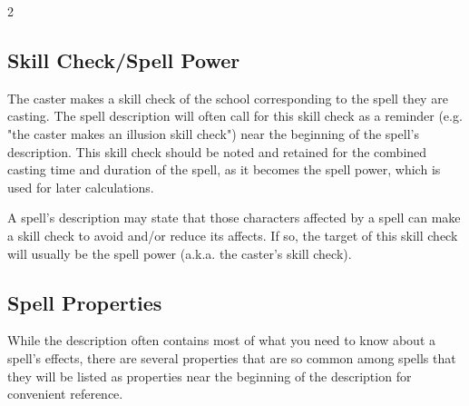 \begin{multicols*}{2}
    \subsection{Skill Check/Spell Power}\label{spell power}
    The caster makes a skill check of the school corresponding to the
    spell they are casting. The spell description will often call for
    this skill check as a reminder (e.g. "the caster makes an illusion
    skill check") near the beginning of the spell's description. This
    skill check should be noted and retained for the combined casting
    time and duration of the spell, as it becomes the spell power,
    which is used for later calculations.

    A spell's description may state that those characters affected
    by a spell can make a skill check to avoid and/or reduce its
    affects. If so, the target of this skill check will usually be
    the spell power (a.k.a. the caster's skill check).

    \subsection{Spell Properties}
    While the description often contains most of what you need to know
    about a spell's effects, there are several properties that are so
    common among spells that they will be listed as properties near
    the beginning of the description for convenient reference.


\end{multicols*}
